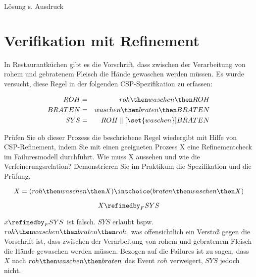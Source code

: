 \documentclass{scrreprt}
\begin{document}
Lösung s. Ausdruck

\section{Verifikation mit Refinement}

In Restaurantküchen gibt es die Vorschrift, dass zwischen der Verarbeitung von
rohem und gebratenem Fleisch die Hände gewaschen werden müssen. Es wurde
versucht, diese Regel in der folgenden CSP-Spezifikation zu erfassen:

\begin{eqnarray*}
  ROH &=& roh \then waschen \then ROH \\
  BRATEN &=& waschen \then braten \then BRATEN \\
  SYS &=& ROH \parallel[\set{waschen}] BRATEN
\end{eqnarray*}

Prüfen Sie ob dieser Prozess die beschriebene Regel wiedergibt mit Hilfe von CSP-Refinement,
indem Sie mit einen geeigneten Prozess X eine Refinementcheck im Failuresmodell durchführt.
Wie muss X aussehen und wie die Verfeinerungsrelation?
Demonstrieren Sie im Praktikum die Spezifikation und die Prüfung.

\begin{equation*}
  X = (roh \then waschen \then X) \intchoice (braten \then waschen \then X)
\end{equation*}

\begin{equation*}
  X \refinedby_F SYS
\end{equation*}

$x \refinedby_F SYS$ ist falsch. $SYS$ erlaubt bspw. $roh \then waschen \then braten \then roh$,
was offensichtlich ein Verstoß gegen die Vorschrift ist, dass zwischen der Verarbeitung von
rohem und gebratenem Fleisch die Hände gewaschen werden müssen. Bezogen auf die Failures ist zu
sagen, dass $X$ nach $roh \then waschen \then braten$ das Event $roh$ verweigert, $SYS$ jedoch
nicht.
\end{document}
